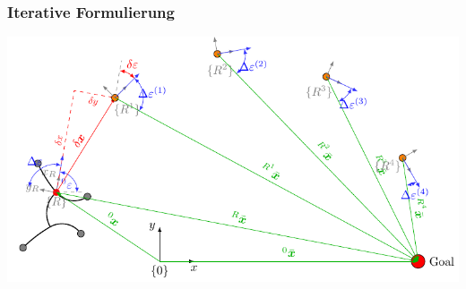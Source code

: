 \documentclass[10pt,a4paper]{article}
\begin{document}
\subsubsection{Iterative Formulierung}

\includegraphics[scale=1]{pics/general_model/model_cost_2.pdf}
\end{document}
